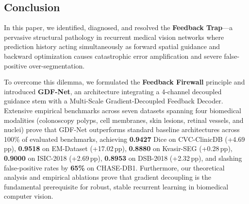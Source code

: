 \subsection{Conclusion}
In this paper, we identified, diagnosed, and resolved the \textbf{Feedback Trap}---a pervasive structural pathology in recurrent medical vision networks where prediction history acting simultaneously as forward spatial guidance and backward optimization causes catastrophic error amplification and severe false-positive over-segmentation.

To overcome this dilemma, we formulated the \textbf{Feedback Firewall} principle and introduced \textbf{GDF-Net}, an architecture integrating a 4-channel decoupled guidance stem with a Multi-Scale Gradient-Decoupled Feedback Decoder. Extensive empirical benchmarks across seven datasets spanning four biomedical modalities (colonoscopy polyps, cell membranes, skin lesions, retinal vessels, and nuclei) prove that GDF-Net outperforms standard baseline architectures across 100\% of evaluated benchmarks, achieving \textbf{0.9427} Dice on CVC-ClinicDB (+4.69\,pp), \textbf{0.9518} on EM-Dataset (+17.02\,pp), \textbf{0.8880} on Kvasir-SEG (+0.28\,pp), \textbf{0.9000} on ISIC-2018 (+2.69\,pp), \textbf{0.8953} on DSB-2018 (+2.32\,pp), and slashing false-positive rates by \textbf{65\%} on CHASE-DB1. Furthermore, our theoretical analysis and empirical ablations prove that gradient decoupling is the fundamental prerequisite for robust, stable recurrent learning in biomedical computer vision.
